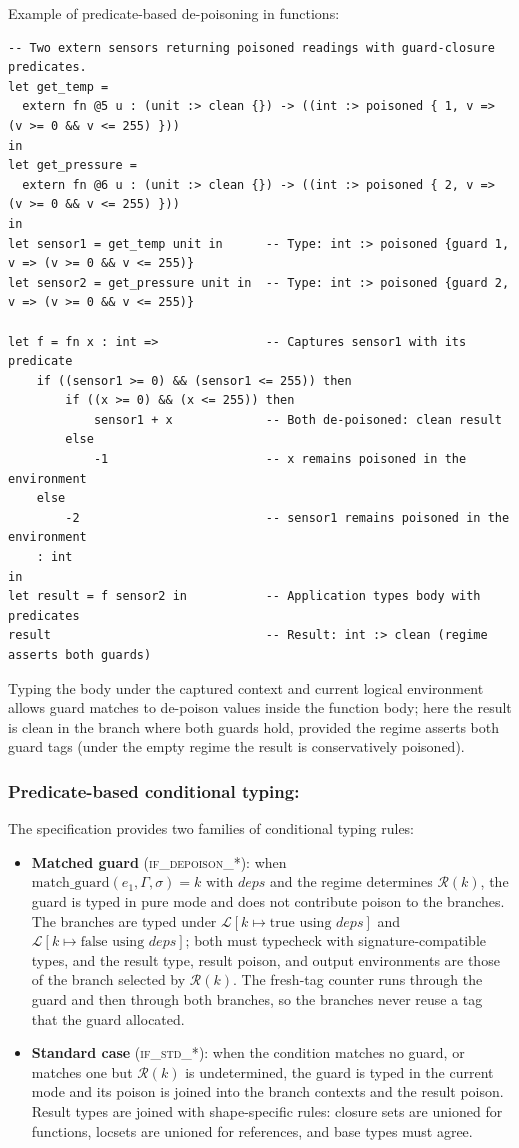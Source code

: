\documentclass[12pt]{article}
\begin{document}
Example of predicate-based de-poisoning in functions:
\begin{lstlisting}[language=poison]
-- Two extern sensors returning poisoned readings with guard-closure predicates.
let get_temp =
  extern fn @5 u : (unit :> clean {}) -> ((int :> poisoned { 1, v => (v >= 0 && v <= 255) }))
in
let get_pressure =
  extern fn @6 u : (unit :> clean {}) -> ((int :> poisoned { 2, v => (v >= 0 && v <= 255) }))
in
let sensor1 = get_temp unit in      -- Type: int :> poisoned {guard 1, v => (v >= 0 && v <= 255)}
let sensor2 = get_pressure unit in  -- Type: int :> poisoned {guard 2, v => (v >= 0 && v <= 255)}

let f = fn x : int =>               -- Captures sensor1 with its predicate
    if ((sensor1 >= 0) && (sensor1 <= 255)) then
        if ((x >= 0) && (x <= 255)) then
            sensor1 + x             -- Both de-poisoned: clean result
        else
            -1                      -- x remains poisoned in the environment
    else
        -2                          -- sensor1 remains poisoned in the environment
    : int
in
let result = f sensor2 in           -- Application types body with predicates
result                              -- Result: int :> clean (regime asserts both guards)
\end{lstlisting}

Typing the body under the captured context and current logical environment
allows guard matches to de-poison values inside the function body; here the
result is clean in the branch where both guards hold, provided the regime
asserts both guard tags (under the empty regime the result is conservatively
poisoned).

\subsubsection*{Predicate-based conditional typing:}
The specification provides two families of conditional typing rules:
\begin{itemize}
    \item \textbf{Matched guard} (\textsc{if\_depoison\_*}): when
    $\text{match\_guard}(e_1, \Gamma, \sigma) = k \text{ with } deps$ and the
    regime determines $\mathcal{R}(k)$, the
    guard is typed in pure mode and does not contribute poison to the branches.
    The branches are typed under $\mathcal{L}[k \mapsto \text{true using } deps]$
    and $\mathcal{L}[k \mapsto \text{false using } deps]$; both must typecheck
    with signature-compatible types, and the result type, result poison, and
    output environments are those of the branch selected by $\mathcal{R}(k)$.
    The fresh-tag counter runs through the guard and then through both
    branches, so the branches never reuse a tag that the guard allocated.
    \item \textbf{Standard case} (\textsc{if\_std\_*}): when the condition matches
    no guard, or matches one but $\mathcal{R}(k)$ is undetermined, the guard is
    typed in the current mode and its poison is joined into
    the branch contexts and the result poison. Result types are joined
    with shape-specific rules: closure sets are unioned for functions, locsets are
    unioned for references, and base types must agree.
\end{itemize}
\end{document}
